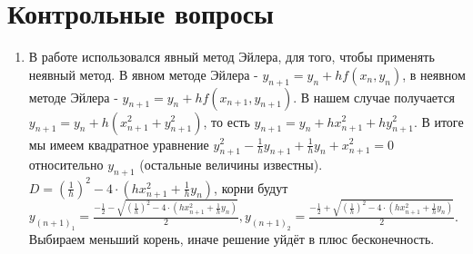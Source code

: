 \chapter{Контрольные вопросы}
\begin{enumerate}
\item В работе использовался явный метод Эйлера, для того, чтобы применять неявный метод. В явном методе Эйлера - $y_{n+1} = y_{n} + hf(x_{n}, y_{n})$, в неявном методе Эйлера - $y_{n+1} = y_{n} + hf(x_{n+1}, y_{n+1})$.  В нашем случае получается $y_{n+1} = y_{n} + h (x_{n+1}^{2} + y_{n+1}^{2})$, то есть $y_{n+1} = y_{n} + h x_{n+1}^{2} + h y_{n+1}^{2}$. В итоге мы имеем квадратное уравнение $y_{n+1}^{2} - \frac{1}{h} y_{n+1} + \frac{1}{h} y_{n} + x_{n+1}^{2} = 0$ относительно $y_{n+1}$ (остальные величины известны). $D = (\frac{1}{h})^{2} - 4 \cdot (h x_{n+1}^{2} + \frac{1}{h} y_{n})$, корни будут $y_{(n+1)_{1}} = \frac{-\frac{1}{2} - \sqrt{(\frac{1}{h})^{2} - 4 \cdot (h x_{n+1}^{2} + \frac{1}{h} y_{n})}}{2}, y_{(n+1)_{2}} = \frac{-\frac{1}{2} + \sqrt{(\frac{1}{h})^{2} - 4 \cdot (h x_{n+1}^{2} + \frac{1}{h} y_{n})}}{2}$. Выбираем меньший корень, иначе решение уйдёт в плюс бесконечность.
\end{enumerate}